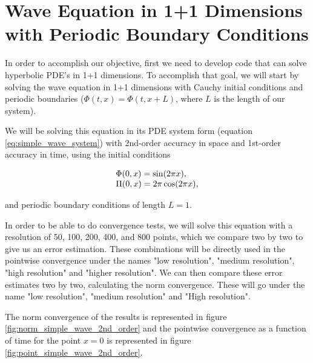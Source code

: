 \section{Wave Equation in 1+1 Dimensions with Periodic Boundary Conditions}
\label{sec:simple_wave}

In order to accomplish our objective, first we need to develop code that can solve hyperbolic PDE's in 1+1 dimensions. To accomplish that goal, we will start by solving the wave equation in 1+1 dimensions with Cauchy initial conditions and periodic boundaries ($\Phi(t,x) = \Phi(t,x+L)$, where $L$ is the length of our system).

We will be solving this equation in its PDE system form (equation \eqref{eq:simple_wave_system}) with 2nd-order accuracy in space and 1st-order accuracy in time, using the initial conditions

\begin{align}
    \begin{array}{@{}l@{}}
        \Phi(0,x) = \sin(2\pi x),
        \\
        \Pi(0,x) = 2\pi \cos(2\pi x),
    \end{array}
    \label{eq:sin_IC}
\end{align}

\noindent
and periodic boundary conditions of length $L = 1$. 

In order to be able to do convergence tests, we will solve this equation with a resolution of 50, 100, 200, 400, and 800 points, which we compare two by two to give us an error estimation. These combinations will be directly used in the pointwise convergence under the names "low resolution", "medium resolution", "high resolution" and "higher resolution". We can then compare these error estimates two by two, calculating the norm convergence. These will go under the name "low resolution", "medium resolution" and "High resolution".

The norm convergence of the results is represented in figure \ref{fig:norm_simple_wave_2nd_order} and the pointwise convergence as a function of time for the point $x=0$ is represented in figure \ref{fig:point_simple_wave_2nd_order}.

